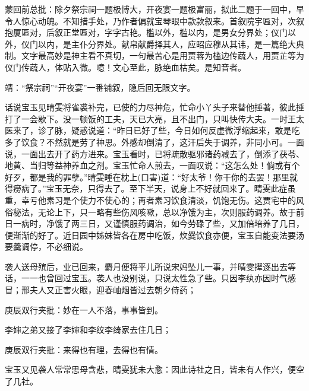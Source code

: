 \begin{parag}
    \begin{note}蒙回前总批：除夕祭宗祠一题极博大，开夜宴一题极富丽，拟此二题于一回中，早令人惊心动魄。不知措手处，乃作者偏就宝琴眼中款款叙来。首叙院宇匾对，次叙抱厦匾对，后叙正堂匾对，字字古艳。槛以外，槛以内，是男女分界处；仪门以外，仪门以内，是主仆分界处。献帛献爵择其人，应昭应穆从其讳，是一篇绝大典制。文字最高妙是神主看不真切，一句最苦心是用贾蓉为槛边传蔬人，用贾芷等为仪门传蔬人，体贴入微。噫！文心至此，脉绝血枯矣。是知音者。\end{note}
\end{parag}


\begin{parag}
    \begin{note}靖：“祭宗祠”“开夜宴”一番铺叙，隐后回无限文字。\end{note}
\end{parag}


\begin{parag}
    话说宝玉见晴雯将雀裘补完，已使的力尽神危，忙命小丫头子来替他捶著，彼此捶打了一会歇下。没一顿饭的工夫，天已大亮，且不出门，只叫快传大夫。一时王太医来了，诊了脉，疑惑说道：“昨日已好了些，今日如何反虚微浮缩起来，敢是吃多了饮食？不然就是劳了神思。外感却倒清了，这汗后失于调养，非同小可。一面说，一面出去开了药方进来。宝玉看时，已将疏散驱邪诸药减去了，倒添了茯苓、地黄、当归等益神养血之剂。宝玉忙命人煎去，一面叹说：“这怎么处！倘或有个好歹，都是我的罪孽。”晴雯睡在枕上(口害)道：“好太爷！你干你的去罢！那里就得痨病了。”宝玉无奈，只得去了。至下半天，说身上不好就回来了。晴雯此症虽重，幸亏他素习是个使力不使心的；再者素习饮食清淡，饥饱无伤。这贾宅中的风俗秘法，无论上下，只一略有些伤风咳嗽，总以净饿为主，次则服药调养。故于前日一病时，净饿了两三日，又谨慎服药调治，如今劳碌了些，又加倍培养了几日，便渐渐的好了。近日园中姊妹皆各在房中吃饭，炊爨饮食亦便，宝玉自能变法要汤要羹调停，不必细说。
\end{parag}


\begin{parag}
    袭人送母殡后，业已回来，麝月便将平儿所说宋妈坠儿一事，并晴雯撵逐出去等话，一一也曾回过宝玉。袭人也没别说，只说太性急了些。只因李纨亦因时气感冒；邢夫人又正害火眼，迎春岫烟皆过去朝夕侍药；\begin{note}庚辰双行夹批：妙在一人不落，事事皆到。\end{note}李婶之弟又接了李婶和李纹李绮家去住几日；\begin{note}庚辰双行夹批：来得也有理，去得也有情。\end{note}宝玉又见袭人常常思母含悲，晴雯犹未大愈：因此诗社之日，皆未有人作兴，便空了几社。
\end{parag}



